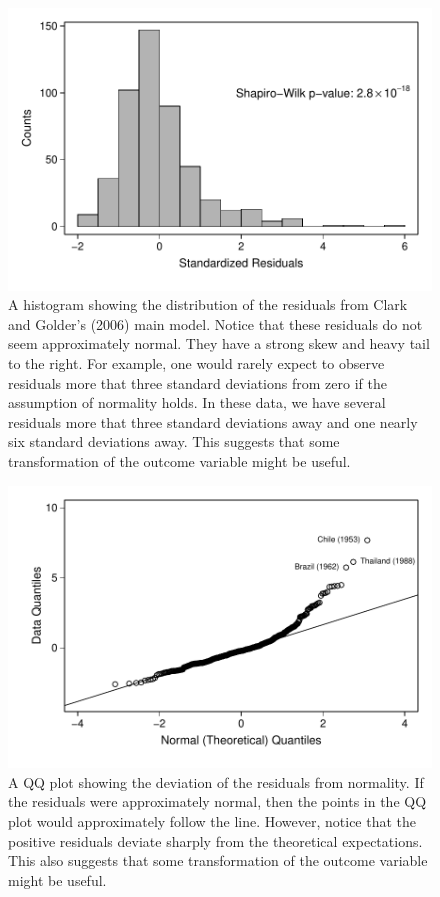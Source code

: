 \documentclass[12pt]{article}
\begin{document}
\begin{figure}[H]
\begin{center}
\includegraphics[scale = 0.6]{figs/cg-residuals-hist.pdf}
\caption{A histogram showing the distribution of the residuals from Clark and Golder's (2006) main model. Notice that these residuals do not seem approximately normal. They have a strong skew and heavy tail to the right. For example, one would rarely expect to observe residuals more that three standard deviations from zero if the assumption of normality holds. In these data, we have several residuals more that three standard deviations away and one nearly six standard deviations away. This suggests that some transformation of the outcome variable might be useful.}\label{fig:cg-residuals-hist}	
\end{center}
\end{figure}

\begin{figure}[H]
\begin{center}
	\includegraphics[scale = 0.6]{figs/cg-qq-plot.pdf}
\caption{A QQ plot showing the deviation of the residuals from normality. If the residuals were approximately normal, then the points in the QQ plot would approximately follow the line. However, notice that the positive residuals deviate sharply from the theoretical expectations. This also suggests that some transformation of the outcome variable might be useful.}\label{fig:cg-qq-plot}
\end{center}

\end{figure}
\end{document}
